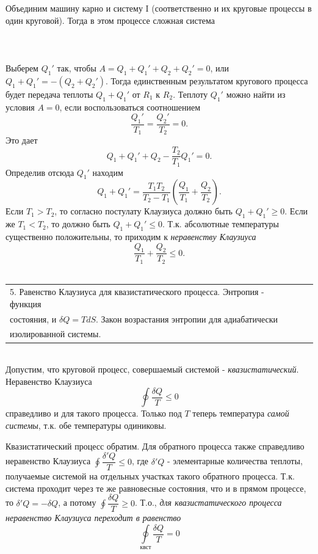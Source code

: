 \documentclass[14pt,a4paper]{scrartcl}
\begin{document}
	\quad Объединим машину карно и систему I (соответственно и их круговые процессы в один круговой). Тогда в этом процессе сложная система\\
	\\
	\\
	\\
	
	Выберем $Q_1' $ так, чтобы $A = Q_1 + Q_1' +Q_2 +Q_2' = 0$, или $Q_1 +Q_1' = -(Q_2+Q_2')$. Тогда единственным результатом кругового процесса будет передача теплоты $Q_1 +Q_1'$  от $R_1$ к $R_2$. Теплоту $Q_1'$ можно найти из условия $A = 0$, если воспользоваться соотношением $$\dfrac{Q_1'}{T_1}=\dfrac{Q_2'}{T_2}=0.$$ Это дает $$Q_1 +Q_1' +Q_2 - \dfrac{T_2}{T_1}Q_1' = 0.$$ Определив отсюда $Q_1'$ находим $$Q_1 +Q_1' = \dfrac{T_1T_2}{T_2 - T_1}(\dfrac{Q_1}{T_1}+\dfrac{Q_2}{T_2}).$$ Если $T_1 > T_2$, то согласно постулату Клаузиуса должно быть $Q_1 +Q_1' \geqslant 0$. Если же $T_1 < T_2$, то должно быть $Q_1 +Q_1' \leqslant 0$. Т.к. абсолютные температуры существенно положительны, то приходим к \textit{неравенству Клаузиуса} $$\boxed{\dfrac{Q_1}{T_1}+\dfrac{Q_2}{T_2}\leqslant 0.}$$\\
	
	
	\begin{tabular}[t]{|l|ll|} 
		\hline
		5. Равенство Клаузиуса для квазистатического процесса. Энтропия - функция\\
		состояния, и $\delta Q = T dS$. Закон возрастания энтропии для адиабатически\\
		изолированной системы.\\
		\hline
	\end{tabular}\\
	
	\quad Допустим, что круговой процесс, совершаемый системой - \textit{квазистатический}. Неравенство Клаузиуса $$\oint \dfrac{\delta Q}{T}\leqslant 0$$ справедливо и для такого процесса. Только под $T$ теперь температура \textit{самой системы}, т.к. обе температуры одиниковы.
	
	\quad Квазистатический процесс обратим. Для обратного процесса также справедливо неравенство Клаузиуса $\oint \dfrac{\delta' Q}{T}\leqslant 0$, где $\delta' Q$ - элементарные количества теплоты, получаемые системой на отдельных участках такого обратного процесса. Т.к. система проходит через те же равновесные состояния, что и в прямом процессе, то $\delta' Q = -\delta Q$, а потому $\oint \dfrac{\delta Q}{T}\geqslant 0$. Т.о., \textit{для квазистатического процесса неравенство Клаузиуса переходит в равенство} $$\oint\limits_{\text{квст}} \dfrac{\delta Q}{T} = 0$$
	
\end{document}
